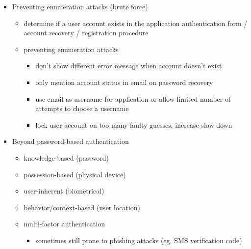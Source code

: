 \documentclass[12pt,titlepage,a4paper]{report}
\begin{document}
\begin{itemize}
 		\item Preventing enumeration attacks (brute force)
 		\begin{itemize}
 			\item determine if a user account exists in the application
 				\subitem authentication form / account recovery / registration procedure
				\item  preventing enumeration attacks
					\begin{itemize}
						\item don't show different error message when account doesn't exist
						\item only mention account status in email on password recovery
						\item use email as username for application or allow limited number of attempts to choose a username
						\item lock user account on too many faulty guesses, increase slow down
					\end{itemize}
 		\end{itemize}
 	
 		\item Beyond password-based authentication
 		\begin{itemize}
 			\item knowledge-based (password)
 			\item possession-based (physical device)
 			\item user-inherent (biometrical)
 			\item behavior/context-based (user location)
 			\item multi-factor authentication
 				\begin{itemize}
 					\item sometimes still prone to phishing attacks (eg. SMS verification code)
 				\end{itemize}
 		\end{itemize}
	 \end{itemize}
 
\end{document}
